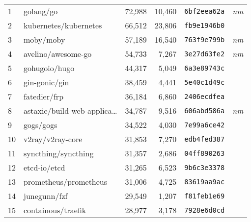 {\fontsize{5.3}{6}\selectfont
    \begin{supertabular}{llrrll}

        1   &                          golang/go & 72,988 & 10,460 &  \texttt{6bf2eea62a} &  \textit{nm} \\
        2   &              kubernetes/kubernetes & 66,512 & 23,806 &  \texttt{fb9e1946b0} &              \\
        3   &                          moby/moby & 57,189 & 16,540 &  \texttt{763f9e799b} &  \textit{nm} \\
        4   &                 avelino/awesome-go & 54,733 &  7,267 &  \texttt{3e27d63fe2} &  \textit{nm} \\
        5   &                      gohugoio/hugo & 44,317 &  5,049 &  \texttt{6a3e89743c} &              \\
        6   &                      gin-gonic/gin & 38,459 &  4,441 &  \texttt{5e40c1d49c} &              \\
        7   &                       fatedier/frp & 36,184 &  6,860 &  \texttt{2406ecdfea} &              \\
        8   &    astaxie/build-web-applica\ldots & 34,787 &  9,516 &  \texttt{606abd586a} &  \textit{nm} \\
        9   &                          gogs/gogs & 34,522 &  4,030 &  \texttt{7e99a6ce42} &              \\
        10  &                   v2ray/v2ray-core & 31,853 &  7,270 &  \texttt{edb4fed387} &              \\
        11  &                syncthing/syncthing & 31,357 &  2,686 &  \texttt{04ff890263} &              \\
        12  &                       etcd-io/etcd & 31,265 &  6,523 &  \texttt{9b6c3e3378} &              \\
        13  &              prometheus/prometheus & 31,006 &  4,725 &  \texttt{83619aa9ac} &              \\
        14  &                       junegunn/fzf & 29,549 &  1,207 &  \texttt{f81feb1e69} &              \\
        15  &                 containous/traefik & 28,977 &  3,178 &  \texttt{7928e6d0cd} &              \\

\end{supertabular}}
